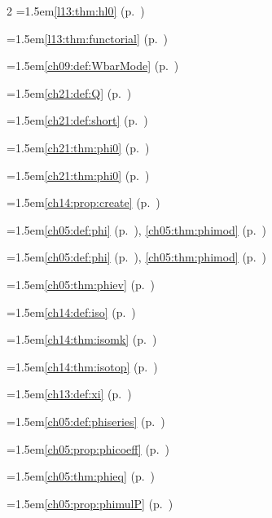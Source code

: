 \begin{multicols}{2}
\hangindent=1.5em\quad \ref{l13:thm:hl0} (p.~\pageref{l13:thm:hl0})\par
\hangindent=1.5em\quad \ref{l13:thm:functorial} (p.~\pageref{l13:thm:functorial})\par
\hangindent=1.5em\quad \ref{ch09:def:WbarMode} (p.~\pageref{ch09:def:WbarMode})\par
\hangindent=1.5em\quad \ref{ch21:def:Q} (p.~\pageref{ch21:def:Q})\par
\hangindent=1.5em\quad \ref{ch21:def:short} (p.~\pageref{ch21:def:short})\par
\hangindent=1.5em\quad \ref{ch21:thm:phi0} (p.~\pageref{ch21:thm:phi0})\par
\hangindent=1.5em\quad \ref{ch21:thm:phi0} (p.~\pageref{ch21:thm:phi0})\par
\hangindent=1.5em\quad \ref{ch14:prop:create} (p.~\pageref{ch14:prop:create})\par
\hangindent=1.5em\quad \ref{ch05:def:phi} (p.~\pageref{ch05:def:phi}), \ref{ch05:thm:phimod} (p.~\pageref{ch05:thm:phimod})\par
\hangindent=1.5em\quad \ref{ch05:def:phi} (p.~\pageref{ch05:def:phi}), \ref{ch05:thm:phimod} (p.~\pageref{ch05:thm:phimod})\par
\hangindent=1.5em\quad \ref{ch05:thm:phiev} (p.~\pageref{ch05:thm:phiev})\par
\hangindent=1.5em\quad \ref{ch14:def:iso} (p.~\pageref{ch14:def:iso})\par
\hangindent=1.5em\quad \ref{ch14:thm:isomk} (p.~\pageref{ch14:thm:isomk})\par
\hangindent=1.5em\quad \ref{ch14:thm:isotop} (p.~\pageref{ch14:thm:isotop})\par
\hangindent=1.5em\quad \ref{ch13:def:xi} (p.~\pageref{ch13:def:xi})\par
\hangindent=1.5em\quad \ref{ch05:def:phiseries} (p.~\pageref{ch05:def:phiseries})\par
\hangindent=1.5em\quad \ref{ch05:prop:phicoeff} (p.~\pageref{ch05:prop:phicoeff})\par
\hangindent=1.5em\quad \ref{ch05:thm:phieq} (p.~\pageref{ch05:thm:phieq})\par
\hangindent=1.5em\quad \ref{ch05:prop:phimulP} (p.~\pageref{ch05:prop:phimulP})\par

\end{multicols}
